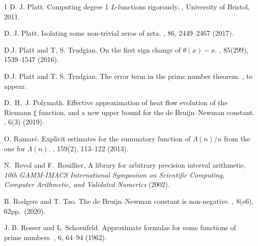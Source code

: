 \documentclass[12pt]{article}
\begin{document}
\begin{thebibliography}{1}
D. J. Platt.
\newblock Computing degree 1 $L$-functions rigorously. 
, University of Bristol, 2011.

D. J. Platt.
\newblock Isolating some non-trivial zeros of zeta. 
, 86, 2449--2467 (2017). 

D.J. Platt and T. S. Trudgian.
\newblock On the first sign change of $\theta(x) -x$.
, 85(299),  1539--1547 (2016).

D.J. Platt and T. S. Trudgian.
\newblock The error term in the prime number theorem.
, to appear.



D.~H.~J. Polymath.
\newblock Effective approximation of heat flow evolution of the Riemann $\xi$ function, and a new upper bound for the de Bruijn--Newman constant.
, 6(3) (2019).

O. Ramar\'{e}.
\newblock Explicit estimates for the summatory function of $\Lambda(n)/n$ from the one for $\Lambda(n)$.
, 159(2), 113--122 (2013).

N.~Revol and F.~Rouillier, {{A library for arbitrary precision interval
  arithmetic}}, \emph{{10th GAMM-IMACS International Symposium on Scientific
  Computing, Computer Arithmetic, and Validated Numerics}} (2002).
  
  B. Rodgers and T. Tao.
  \newblock The de Bruijn--Newman constant is non-negative.
  , 8(e6), 62pp.\ (2020).

J. B. Rosser and L. Schoenfeld.
\newblock Approximate formulas for some functions of prime numbers.
, 6, 64--94 (1962).






\end{thebibliography}
\end{document}
